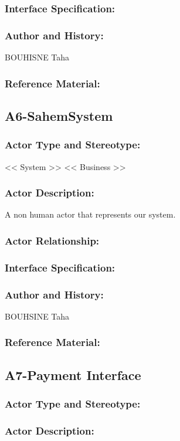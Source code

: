 \documentclass[11pt, openany]{report}
\begin{document}
\subsubsection{Interface Specification:}
\subsubsection{Author and History:}
BOUHISNE Taha
\subsubsection{Reference Material:}

\clearpage
\subsection{A6-SahemSystem}
\label{A6}
\subsubsection{Actor Type and Stereotype:}
<< System >> << Business >>
\subsubsection{Actor Description:}
A non human actor that represents our system.
\subsubsection{Actor Relationship:}
\subsubsection{Interface Specification:}
\subsubsection{Author and History:}
BOUHSINE Taha
\subsubsection{Reference Material:}

\clearpage
\subsection{A7-Payment Interface}
\label{A7}
\subsubsection{Actor Type and Stereotype:}
\subsubsection{Actor Description:}
\end{document}
